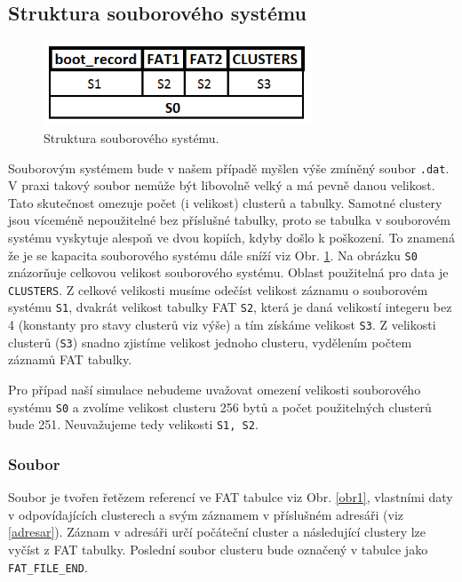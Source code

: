 \documentclass[12pt]{article}
\begin{document}
\subsection{Struktura souborového systému}
\begin{figure}
\centering
\vspace{-0.5cm}
\includegraphics[width=8cm]{Structure.png}
\caption{Struktura souborového systému.}
\label{obr2}
\end{figure}
Souborovým systémem bude v našem případě myšlen výše zmíněný soubor \texttt{.dat}. V praxi takový soubor nemůže být libovolně velký a má pevně danou velikost. Tato skutečnost omezuje počet (i velikost) clusterů a tabulky. Samotné clustery jsou víceméně nepoužitelné bez příslušné tabulky, proto se tabulka v souborovém systému vyskytuje alespoň ve dvou kopiích, kdyby došlo k poškození. To znamená že je se kapacita souborového systému dále sníží viz Obr. \ref{obr2}.  Na obrázku \texttt{S0} znázorňuje celkovou velikost souborového systému. Oblast použitelná pro data je \texttt{CLUSTERS}. Z celkové velikosti musíme odečíst velikost záznamu o souborovém systému \texttt{S1}, dvakrát velikost tabulky FAT \texttt{S2}, která je daná velikostí integeru bez 4 (konstanty pro stavy clusterů viz výše) a tím získáme velikost \texttt{S3}. Z velikosti clusterů (\texttt{S3}) snadno zjistíme velikost jednoho clusteru, vydělením počtem záznamů FAT tabulky.

Pro případ naší simulace nebudeme uvažovat omezení velikosti  souborového systému \texttt{S0} a zvolíme velikost clusteru 256 bytů a počet použitelných clusterů bude 251. Neuvažujeme tedy velikosti \texttt{S1, S2}.

\pagebreak

\subsubsection{Soubor}
Soubor je tvořen řetězem referencí ve FAT tabulce viz Obr. \ref{obr1}, vlastními daty v odpovídajících clusterech a svým záznamem v příslušném adresáři (viz \ref{adresar}). Záznam v adresáři určí počáteční cluster a následující clustery lze vyčíst z FAT tabulky. Poslední soubor clusteru bude označený v tabulce jako \texttt{FAT\_FILE\_END}.
\end{document}
